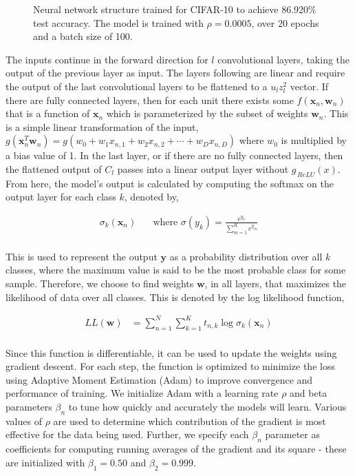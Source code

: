 \documentclass[conference]{IEEEtran}
\newcommand{\xv}{\mathbf{x}}
\newcommand{\yv}{\mathbf{y}}
\newcommand{\wv}{\mathbf{w}}
\begin{document}
\begin{figure*}[!t]
	\centering
	
    \captionsetup{width=0.90\linewidth}
	\caption{Neural network structure trained for CIFAR-10 to achieve 86.920\% test accuracy. The model is trained with $\rho = 0.0005$, over 20 epochs and a batch size of 100.}
	\label{fig:cifar_network_structure}
\end{figure*}

The inputs continue in the forward direction for $l$ convolutional layers, taking the output of the previous layer as input. The layers following are linear and require the output of the last convolutional layers to be flattened to a $u_l z_l^2$ vector. If there are fully connected layers, then for each unit there exists some $f(\xv_n, \wv_n)$ that is a function of $\xv_n$ which is parameterized by the subset of weights $\wv_n$. This is a simple linear transformation of the input, $g(\xv_n^T \wv_n) = g(w_0 + w_1 x_{n,1} + w_2 x_{n,2} + \cdots + w_D x_{n,D})$ where $w_0$ is multiplied by a bias value of 1. In the last layer, or if there are no fully connected layers, then the flattened output of $C_l$ passes into a linear output layer without $g_{\,ReLU}(x)$. From here, the model's output is calculated by computing the softmax on the output layer for each class $k$, denoted by,

\begin{align*}
\sigma_k(\xv_n)\;\;\;\;\; 
    \text{ where } \sigma(y_k) = \frac{e^{y_k}}{\sum_{m=1}^K e^{y_m}} \\
\end{align*}

This is used to represent the output $\yv$ as a probability distribution over all $k$ classes, where the maximum value is said to be the most probable class for some sample. Therefore, we choose to find weights $\wv$, in all layers, that maximizes the likelihood of data over all classes. This is denoted by the log likelihood function,

\begin{align*}
      LL(\wv) & = \sum_{n=1}^N \sum_{k=1}^K t_{n,k} \log \sigma_k(\xv_n) \\ 
\end{align*}

Since this function is differentiable, it can be used to update the weights using gradient descent. For each step, the function is optimized to minimize the loss using Adaptive Moment Estimation (Adam) to improve convergence and performance of training. We initialize Adam with a learning rate $\rho$ and beta parameters $\beta_n$ to tune how quickly and accurately the models will learn. Various values of $\rho$ are used to determine which contribution of the gradient is most effective for the data being used. Further, we specify each $\beta_n$ parameter as coefficients for computing running averages of the gradient and its square - these are initialized with $\beta_1 = 0.50$ and $\beta_2 = 0.999$.
\end{document}
